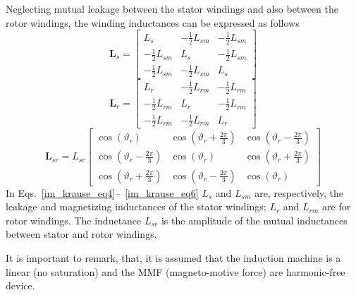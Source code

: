 \documentclass[11pt,a4paper,oneside]{book}
\numberwithin{equation}{section}
\theoremstyle{it}
\theoremstyle{definition}
\begin{document}
Neglecting mutual leakage between the stator windings and also between the rotor windings, the winding inductances can be expressed as follows
\begin{equation}\label{im_krause_eq4}
	\mathbf{L}_{s} = \begin{bmatrix} L_s & -\frac{1}{2}L_{sm} & -\frac{1}{2}L_{sm} \\[6pt] -\frac{1}{2}L_{sm} & L_s & -\frac{1}{2}L_{sm} \\[6pt] -\frac{1}{2}L_{sm} & -\frac{1}{2}L_{sm} & L_s \end{bmatrix}
\end{equation}
\begin{equation}\label{im_krause_eq5}
	\mathbf{L}_{r} = \begin{bmatrix} L_r & -\frac{1}{2}L_{rm} & -\frac{1}{2}L_{rm} \\[6pt] -\frac{1}{2}L_{rm} & L_r & -\frac{1}{2}L_{rm} \\[6pt] -\frac{1}{2}L_{rm} & -\frac{1}{2}L_{rm} & L_r \end{bmatrix}
\end{equation}
\begin{equation}\label{im_krause_eq6}
	\mathbf{L}_{sr} = {L}_{sr}\begin{bmatrix} \cos(\vartheta_r) & \cos(\vartheta_r+\frac{2\pi}{3}) & \cos(\vartheta_r-\frac{2\pi}{3}) \\[6pt] \cos(\vartheta_r-\frac{2\pi}{3}) & \cos(\vartheta_r) & \cos(\vartheta_r+\frac{2\pi}{3}) \\[6pt] \cos(\vartheta_r+\frac{2\pi}{3}) & \cos(\vartheta_r-\frac{2\pi}{3}) & \cos(\vartheta_r) \end{bmatrix}
\end{equation}
In Eqs.~\eqref{im_krause_eq4}--~\eqref{im_krause_eq6} $L_s$ and $L_{sm}$ are, respectively, the leakage and magnetizing inductances of the stator windings; $L_r$ and $L_{rm}$ are for rotor windings. The inductance $L_{sr}$ is the amplitude of the mutual inductances between stator and rotor windings.

It is important to remark, that, it is assumed that the induction machine is a linear (no saturation) and the MMF (magneto-motive force) are harmonic-free device.
\end{document}
